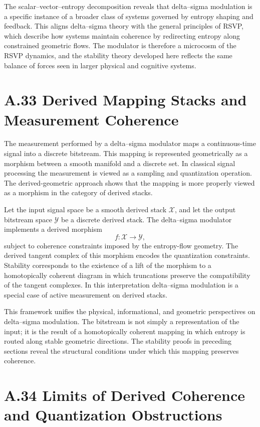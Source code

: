 The scalar–vector–entropy decomposition reveals that delta–sigma modulation is a specific instance of a broader class of systems governed by entropy shaping and feedback. This aligns delta–sigma theory with the general principles of RSVP, which describe how systems maintain coherence by redirecting entropy along constrained geometric flows. The modulator is therefore a microcosm of the RSVP dynamics, and the stability theory developed here reflects the same balance of forces seen in larger physical and cognitive systems.

\section{A.33 Derived Mapping Stacks and Measurement Coherence}

The measurement performed by a delta–sigma modulator maps a continuous-time signal into a discrete bitstream. This mapping is represented geometrically as a morphism between a smooth manifold and a discrete set. In classical signal processing the measurement is viewed as a sampling and quantization operation. The derived-geometric approach shows that the mapping is more properly viewed as a morphism in the category of derived stacks.

Let the input signal space be a smooth derived stack \(\mathcal{X}\), and let the output bitstream space \(\mathcal{Y}\) be a discrete derived stack. The delta–sigma modulator implements a derived morphism
\[
f : \mathcal{X} \longrightarrow \mathcal{Y},
\]
subject to coherence constraints imposed by the entropy-flow geometry. The derived tangent complex of this morphism encodes the quantization constraints. Stability corresponds to the existence of a lift of the morphism to a homotopically coherent diagram in which truncations preserve the compatibility of the tangent complexes. In this interpretation delta–sigma modulation is a special case of active measurement on derived stacks.

This framework unifies the physical, informational, and geometric perspectives on delta–sigma modulation. The bitstream is not simply a representation of the input; it is the result of a homotopically coherent mapping in which entropy is routed along stable geometric directions. The stability proofs in preceding sections reveal the structural conditions under which this mapping preserves coherence.

\section{A.34 Limits of Derived Coherence and Quantization Obstructions}

